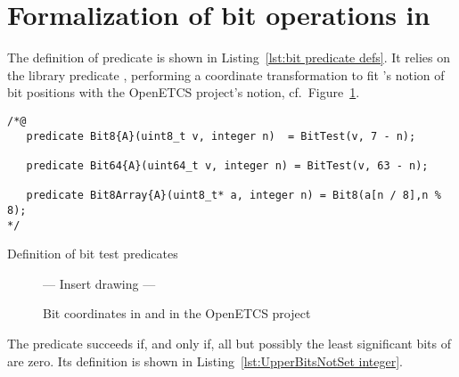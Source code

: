 \FloatBarrier

\section{Formalization of bit operations in \framac}
\label{sec:bit operations in framac}






The definition of predicate  is shown in 
Listing~\ref{lst:bit predicate defs}.
%
It relies on the \framac library predicate ,
performing a coordinate
transformation to fit \framac's notion of bit positions with the
OpenETCS project's
notion, cf.\ Figure~\ref{fig:bit coords}.





\begin{listing}[hbt]
\begin{minipage}{0.99\textwidth}
\begin{lstlisting}[style=acsl-block]
/*@
   predicate Bit8{A}(uint8_t v, integer n)  = BitTest(v, 7 - n);

   predicate Bit64{A}(uint64_t v, integer n) = BitTest(v, 63 - n);

   predicate Bit8Array{A}(uint8_t* a, integer n) = Bit8(a[n / 8],n % 8);
*/
\end{lstlisting}
\end{minipage}
\caption{\label{lst:bit predicate defs}Definition of bit test predicates}
\end{listing}













\begin{figure}
\begin{center}
\vspace*{2cm}
--- Insert drawing --- 
\vspace*{2cm}
\caption{\label{fig:bit coords}
        Bit coordinates in \framac and in the OpenETCS project}
\end{center}
\end{figure}






The predicate  succeeds if,
and only if,
all but possibly 
the least significant  bits of  are zero.
%
Its definition is shown in Listing~\ref{lst:UpperBitsNotSet integer}.







